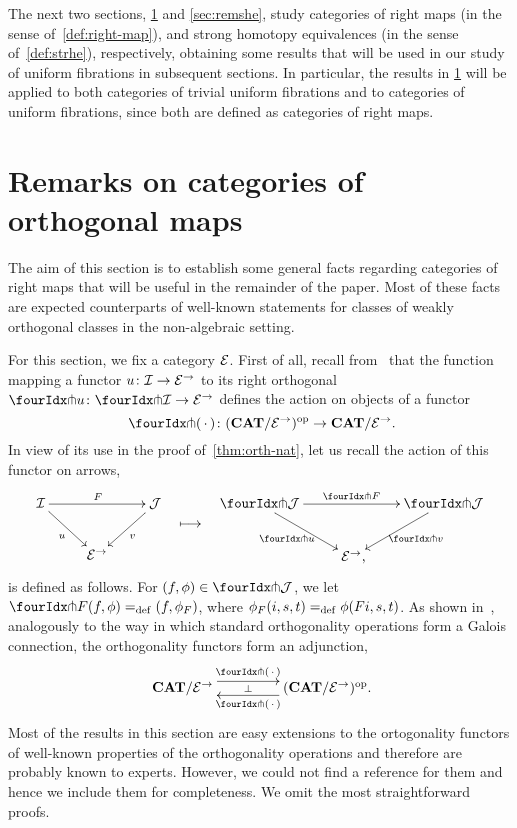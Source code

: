 \documentclass[reqno,10pt,a4paper,oneside,draft]{amsart}
\begin{document}
The next two sections, \cref{sec:ortf} and \cref{sec:remshe}, study categories of right maps (in the sense of~\cref{def:right-map}), and strong homotopy equivalences (in the sense of~\cref{def:strhe}), respectively, obtaining some results that will be used in our study of uniform fibrations in subsequent sections.
In particular, the results in \cref{sec:ortf} will be applied to both categories of trivial uniform fibrations and to categories of uniform fibrations, since both are defined as categories of right maps.


\section{Remarks on categories of orthogonal maps}
\label{sec:ortf}

The aim of this section is to establish some general facts regarding categories of right maps that will be useful in the remainder of the paper.
Most of these facts are expected counterparts of well-known statements for classes of weakly orthogonal classes in the non-algebraic setting.

For this section, we fix a category $\mathcal{E}$.
First of all, recall from~\cite{garner:small-object-argument} that the function mapping a functor $u \colon \mathcal{I} \to \mathcal{E}^\to$ to its right orthogonal $\liftr{u} \co \liftr{\cal{I}} \to \catE^\to$ defines the action on objects of a functor
\[
  \liftr{\brarghole} \co (\CAT/\catE^\to)^{\op} \to \CAT/\catE^\to \rlap{.}
\]
In view of its use in the proof of~\cref{thm:orth-nat}, let us recall the action of this functor on arrows,
\begin{align*}
\xymatrix{
  \cal{I} \ar[dr]_u \ar[rr]^F & & \cal{J} \ar[dl]^{v} \\
  & \catE^\to
}
&&
\xymatrix{
  \ar@{}[d]|{\textstyle\longmapsto} \\
  {}
}
&&
\xymatrix{
  \liftr{\cal{J}} \ar[dr]_{\liftr{u}} \ar[rr]^{\liftr{F}} & & \liftr{\cal{J}} \ar[dl]^{\liftr{v}} \\
  & \catE^\to \rlap{,}
}
\end{align*}
is defined as follows.
For $(f, \phi) \in \liftr{\cal{J}}$, we let $\liftr{F}(f,\phi) \defeq (f, \phi_F)$, where $\phi_F(i, s, t) =_{\operatorname{def}} \phi(Fi, s, t)$.
As shown in~\cite[Proposition~3.8]{garner:small-object-argument}, analogously to the way in which standard orthogonality operations form a Galois connection, the orthogonality functors form an adjunction,
\begin{equation} \label{garner-adjunction}
\begin{gathered}
\xymatrix@C+2em{
  \CAT/\catE^\to
  \ar@<5pt>[r]^-{\liftl{\brarghole}}
  \ar@{}[r]|-{\bot}
&
  (\CAT/\catE^\to)^{\op} \rlap{.}
  \ar@<5pt>[l]^-{\liftr{\brarghole}}
}
\end{gathered}
\end{equation}
Most of the results in this section are easy extensions to the ortogonality functors of well-known properties of the orthogonality operations and therefore are probably known to experts.
However, we could not find a reference for them and hence we include them for completeness.
We omit the most straightforward proofs.
\end{document}
